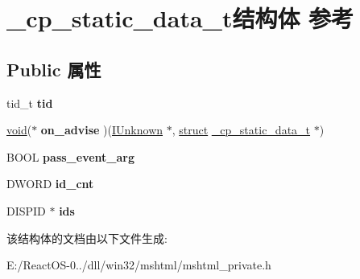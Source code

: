 \hypertarget{struct__cp__static__data__t}{}\section{\+\_\+cp\+\_\+static\+\_\+data\+\_\+t结构体 参考}
\label{struct__cp__static__data__t}
\subsection*{Public 属性}
\begin{DoxyCompactItemize}
\item 
\mbox{\label{struct__cp__static__data__t_a3108e49ae0a9f05ebd56d316855abf10}} 
tid\+\_\+t {\bfseries tid}
\item 
\mbox{\label{struct__cp__static__data__t_a3aeb8fdfa1d3baa713ae75e016f21251}} 
\hyperlink{interfacevoid}{void}($\ast$ {\bfseries on\+\_\+advise} )(\hyperlink{interface_i_unknown}{I\+Unknown} $\ast$, \hyperlink{interfacestruct}{struct} \hyperlink{struct__cp__static__data__t}{\+\_\+cp\+\_\+static\+\_\+data\+\_\+t} $\ast$)
\item 
\mbox{\label{struct__cp__static__data__t_a8b41d8adb818396999a628dbcf4ab85b}} 
B\+O\+OL {\bfseries pass\+\_\+event\+\_\+arg}
\item 
\mbox{\label{struct__cp__static__data__t_a976498adfb6c0a24b7426baf14bdc9c5}} 
D\+W\+O\+RD {\bfseries id\+\_\+cnt}
\item 
\mbox{\label{struct__cp__static__data__t_a98680f1f70ad45738f1bd6ce3e9303fe}} 
D\+I\+S\+P\+ID $\ast$ {\bfseries ids}
\end{DoxyCompactItemize}


该结构体的文档由以下文件生成\+:\begin{DoxyCompactItemize}
\item 
E\+:/\+React\+O\+S-\/0../dll/win32/mshtml/mshtml\+\_\+private.\+h\end{DoxyCompactItemize}
